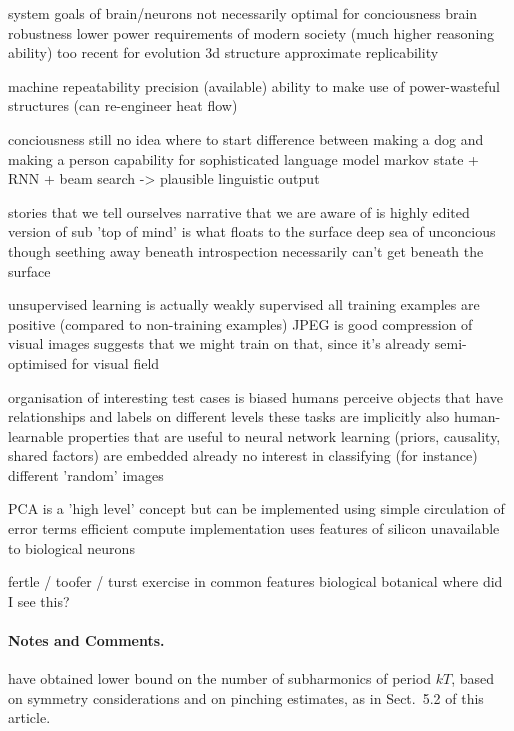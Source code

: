\documentclass{llncs}
\begin{document}
system goals of brain/neurons not necessarily optimal for conciousness
  brain 
    robustness
    lower power
    requirements of modern society (much higher reasoning ability) too recent for evolution
    3d structure
    approximate replicability
    
  machine
    repeatability
    precision (available)
    ability to make use of power-wasteful structures (can re-engineer heat flow)
    

conciousness
  still no idea where to start
  difference between making a dog and making a person
    capability for sophisticated language model
      markov state + RNN + beam search -> plausible linguistic output
  
  stories that we tell ourselves
    narrative that we are aware of is highly edited version of sub
      'top of mind' is what floats to the surface
      deep sea of unconcious though seething away beneath
  introspection necessarily can't get beneath the surface

unsupervised learning is actually weakly supervised 
  all training examples are positive (compared to non-training examples)
  JPEG is good compression of visual images
    suggests that we might train on that, since it's already semi-optimised for visual field

organisation of interesting test cases is biased
  humans perceive objects that have relationships and labels on different levels
    these tasks are implicitly also human-learnable
    properties that are useful to neural network learning (priors, causality, shared factors) are embedded already
  no interest in classifying (for instance) different 'random' images

PCA is a 'high level' concept
  but can be implemented using simple circulation of error terms
  efficient compute implementation uses features of silicon unavailable to biological neurons


fertle / toofer / turst exercise in common features biological botanical
  where did I see this?
  




\paragraph{Notes and Comments.}

have obtained lower bound on the number of subharmonics of period $kT$,
based on symmetry considerations and on pinching estimates, as in
Sect.~5.2 of this article.
\end{document}
